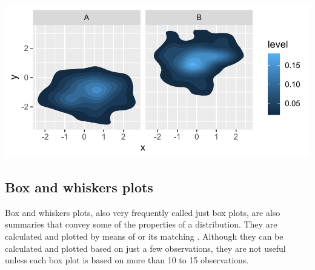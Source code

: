 \documentclass[krantz2]{krantz}\usepackage{knitr}
\begin{document}
\begin{knitrout}\footnotesize
{}\color{fgcolor}\begin{kframe}
\begin{alltt}
  \hlopt{+}
\hlstd{(}\hlstd{(} \hlstd{=}   \hlstd{=} \hlstd{)} \hlopt{+}
  \hlstd{(}\hlopt{~}
\end{alltt}
\end{kframe}

{\centering \includegraphics[width=.7\textwidth]{figure/pos-density-plot-12-1}

}



\end{knitrout}



\subsection{Box and whiskers plots}\label{sec:boxplot}

Box and whiskers plots, also very frequently called just box plots, are also summaries that convey some of the properties of a distribution. They are calculated and plotted by means of  or its matching . Although they can be calculated and plotted based on just a few observations, they are not useful unless each box plot is based on more than 10 to 15 observations.
\end{document}
